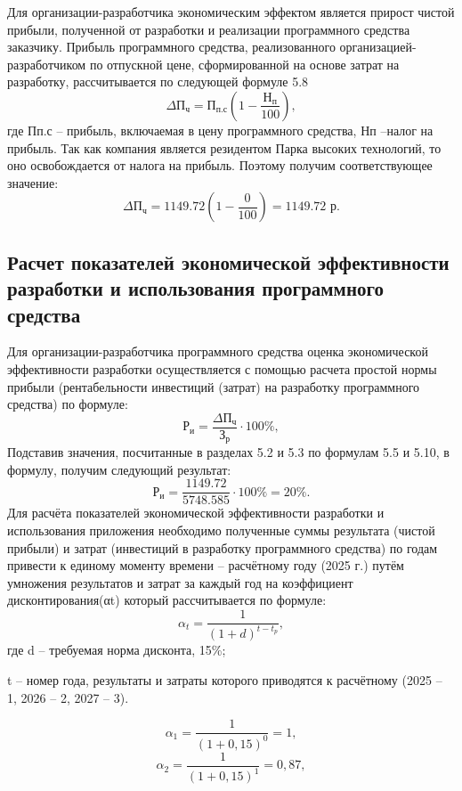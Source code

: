 Для организации-разработчика экономическим эффектом является прирост чистой прибыли, полученной от разработки и реализации программного средства заказчику.
Прибыль программного средства, реализованного организацией-разработчиком по отпускной цене, сформированной на основе затрат на разработку, рассчитывается по следующей формуле 5.8
\begin{equation}
	\Delta 	\mathrm{П_{ч}} = \mathrm{П_{п.с}} \left( 1 - \frac{	\mathrm{Н_{п}}}{100} \right),
\end{equation}
где Пп.с – прибыль, включаемая в цену программного средства, Нп –налог на прибыль. Так как компания является резидентом Парка высоких технологий, то оно освобождается от налога на прибыль. Поэтому получим соответствующее значение:
\[
\Delta \mathrm{П_{ч}} = 1149.72 \left(1 - \frac{0}{100}\right) = 1149.72 \text{ р}.
\]

\subsection{Расчет показателей экономической эффективности разработки и использования программного средства} 

Для организации-разработчика программного средства оценка экономической эффективности разработки осуществляется с помощью расчета простой нормы прибыли (рентабельности инвестиций (затрат) на разработку программного средства) по формуле:
\begin{equation}
		\mathrm{Р_{и}} = \frac{\Delta 	\mathrm{П_{ч}}}{\mathrm{З_{р}}} \cdot 100\%,
\end{equation}
Подставив значения, посчитанные в разделах 5.2 и 5.3 по формулам 5.5 и 5.10, в формулу, получим следующий результат:
\[
\mathrm{Р_{и}} = \frac{1149.72}{5748.585} \cdot 100\% = 20\%.
\]
Для расчёта показателей экономической эффективности разработки и использования приложения необходимо полученные суммы результата (чистой прибыли) и затрат (инвестиций в разработку программного средства) по годам привести к единому моменту времени – расчётному году (2025 г.) путём умножения результатов и затрат за каждый год на коэффициент дисконтирования(αt) который рассчитывается по формуле:
\begin{equation}
	\alpha_t = \frac{1}{(1 + d)^{t - t_p}},
\end{equation}
где d – требуемая норма дисконта, 15\%;
 
t – номер года, результаты и затраты которого приводятся к расчётному (2025 – 1, 2026 – 2, 2027 – 3).

\[
\alpha_1 = \frac{1}{(1+0{,}15)^0} = 1,
\]
\[
\alpha_2 = \frac{1}{(1+0{,}15)^1} = 0{,}87,
\]


